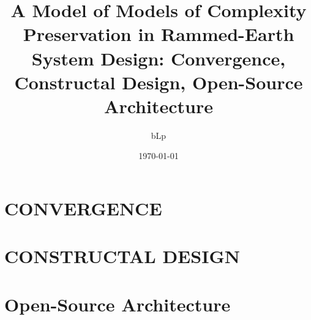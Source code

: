 \documentclass{article}
\begin{document}
\title{A Model of Models of Complexity Preservation in Rammed-Earth System Design: Convergence, Constructal Design, Open-Source Architecture}
\author{bLp}
\date{\today}
\maketitle
\clearpage

\tableofcontents
\clearpage



\clearpage

\section{CONVERGENCE}


\section{CONSTRUCTAL DESIGN}



\section{Open-Source Architecture}






\nocite{}
\printbibliography
\end{document}
